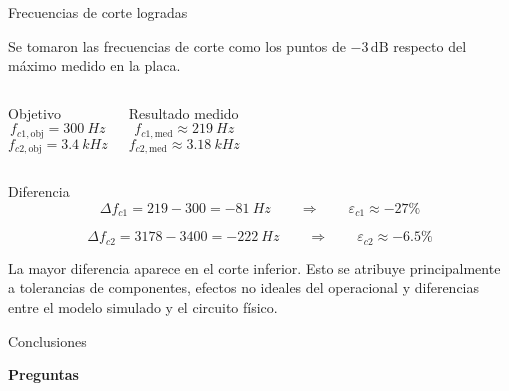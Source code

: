 \documentclass[aspectratio=169,11pt]{beamer}
\begin{document}
\begin{frame}{Frecuencias de corte logradas}

\scriptsize

Se tomaron las frecuencias de corte como los puntos de \(-3\,\mathrm{dB}\) respecto del máximo medido en la placa.

\begin{columns}[c,onlytextwidth]

\begin{block}{Objetivo}
\[
f_{c1,\text{obj}}=\SI{300}{Hz}
\]
\[
f_{c2,\text{obj}}=\SI{3.4}{kHz}
\]
\end{block}

\begin{block}{Resultado medido}
\[
f_{c1,\text{med}}\approx\SI{219}{Hz}
\]
\[
f_{c2,\text{med}}\approx\SI{3.18}{kHz}
\]
\end{block}

\end{columns}

\vspace{0.25cm}

\begin{block}{Diferencia}
\[
\Delta f_{c1}=219-300=-\SI{81}{Hz}
\qquad
\Rightarrow
\qquad
\varepsilon_{c1}\approx -27\%
\]

\[
\Delta f_{c2}=3178-3400=-\SI{222}{Hz}
\qquad
\Rightarrow
\qquad
\varepsilon_{c2}\approx -6.5\%
\]
\end{block}

\scriptsize
La mayor diferencia aparece en el corte inferior. Esto se atribuye principalmente a tolerancias de componentes, efectos no ideales del operacional y diferencias entre el modelo simulado y el circuito físico.

\end{frame}



\begin{frame}{Conclusiones}

    \begin{center}
        \Large \textbf{Preguntas}
    \end{center}
\end{frame}
\end{document}
